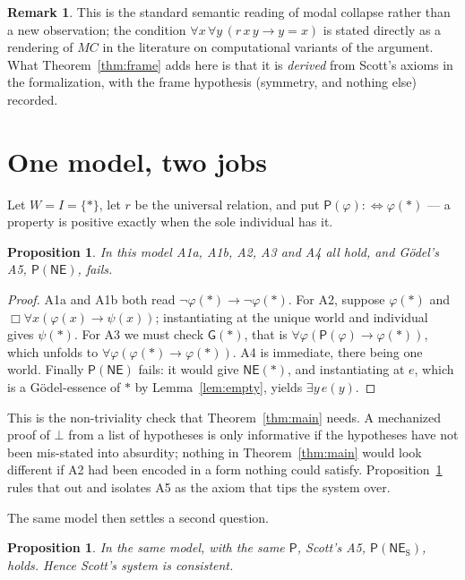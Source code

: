 \documentclass[11pt]{article}
\theoremstyle{plain}
\newtheorem{proposition}[theorem]{Proposition}
\theoremstyle{definition}
\newtheorem{remark}[theorem]{Remark}
\newcommand{\NE}{\mathsf{NE}}
\newcommand{\NES}{\mathsf{NE}_{\mathrm{S}}}
\newcommand{\Gd}{\mathsf{G}}
\newcommand{\Pos}{\mathsf{P}}
\begin{document}
\begin{remark}
This is the standard semantic reading of modal collapse rather than a new
observation; the condition $\forall x\,\forall y\,(r\,x\,y \to y = x)$ is
stated directly as a rendering of $MC$ in the literature on computational
variants of the argument. What Theorem~\ref{thm:frame} adds here is that it is
\emph{derived} from Scott's axioms in the formalization, with the frame
hypothesis (symmetry, and nothing else) recorded.
\end{remark}

\section{One model, two jobs}\label{sec:model}

Let $W = I = \{*\}$, let $r$ be the universal relation, and put
$\Pos(\varphi) :\Leftrightarrow \varphi(*)$ --- a property is positive exactly
when the sole individual has it.

\begin{proposition}\label{prop:toy}
In this model {\rm A1a}, {\rm A1b}, {\rm A2}, {\rm A3} and {\rm A4} all hold,
and G\"odel's {\rm A5}, $\Pos(\NE)$, fails.
\end{proposition}

\begin{proof}
A1a and A1b both read $\neg\varphi(*) \to \neg\varphi(*)$. For A2, suppose
$\varphi(*)$ and $\Box\forall x(\varphi(x)\to\psi(x))$; instantiating at the
unique world and individual gives $\psi(*)$. For A3 we must check $\Gd(*)$,
that is $\forall\varphi(\Pos(\varphi) \to \varphi(*))$, which unfolds to
$\forall\varphi(\varphi(*) \to \varphi(*))$. A4 is immediate, there being one
world. Finally $\Pos(\NE)$ fails: it would give $\NE(*)$, and instantiating at
$e$, which is a G\"odel-essence of $*$ by Lemma~\ref{lem:empty}, yields
$\exists y\, e(y)$.
\end{proof}

This is the non-triviality check that Theorem~\ref{thm:main} needs. A
mechanized proof of $\bot$ from a list of hypotheses is only informative if the
hypotheses have not been mis-stated into absurdity; nothing in
Theorem~\ref{thm:main} would look different if A2 had been encoded in a form
nothing could satisfy. Proposition~\ref{prop:toy} rules that out and isolates
A5 as the axiom that tips the system over.

The same model then settles a second question.

\begin{proposition}\label{prop:scottcons}
In the same model, with the same $\Pos$, Scott's {\rm A5}, $\Pos(\NES)$, holds.
Hence Scott's system is consistent.
\end{proposition}
\end{document}
